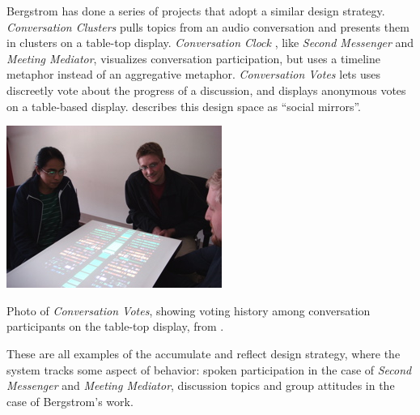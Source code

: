 Bergstrom has done a series of projects that adopt a similar design strategy. \emph{Conversation Clusters} \citep{Bergstrom:2009fe} pulls topics from an audio conversation and presents them in clusters on a table-top display. \emph{Conversation Clock} \citep{Bergstrom:2007je}, like \emph{Second Messenger} and \emph{Meeting Mediator}, visualizes conversation participation, but uses a timeline metaphor instead of an aggregative metaphor. \emph{Conversation Votes} \citep{Bergstrom:2009ej} lets uses discreetly vote about the progress of a discussion, and displays anonymous votes on a table-based display. \citet{Karahalios:hu} describes this design space as ``social mirrors''. 

\begin{marginfigure}
	\includegraphics{figures/conversation_votes.jpg}
	\caption{Photo of \emph{Conversation Votes}, showing voting history among conversation participants on the table-top display, from \citep{Bergstrom:2009ej}.}
	\label{fig:conversation-votes}
\end{marginfigure}




These are all examples of the accumulate and reflect design strategy, where the system tracks some aspect of behavior: spoken participation in the case of \emph{Second Messenger} and \emph{Meeting Mediator}, discussion topics and group attitudes in the case of Bergstrom's work. 




